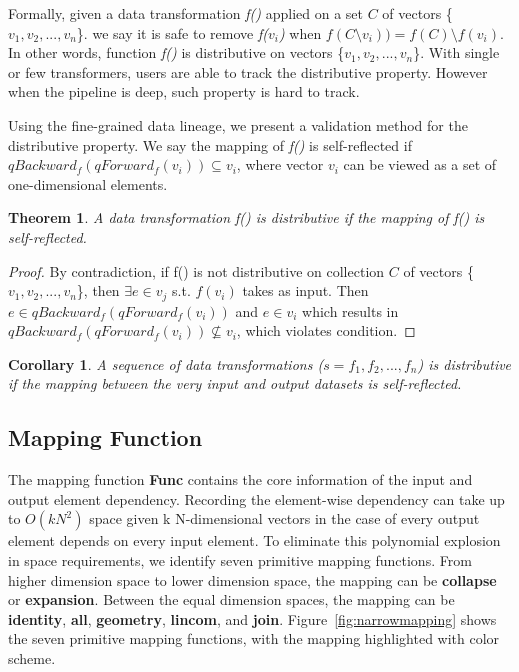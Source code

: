 \documentclass{sig-alternate}
\newtheorem{theorem}{Theorem}[section]
\newtheorem{corollary}{Corollary}[theorem]
\begin{document}
Formally, given a data transformation {\it f()} applied on a set $C$ of vectors \{$v_1, v_2, ..., v_n$\}.
we say it is safe to remove {\it f($v_i$)} when {\it $f(C \setminus {v_i})) = f(C) \setminus {f(v_i)}$}.
In other words, function {\it f()} is distributive on vectors \{$v_1, v_2, ..., v_n$\}. 
With single or few transformers, users are able to track the distributive property.
However when the pipeline is deep, such property is hard to track.

Using the fine-grained data lineage, we present a validation method for the distributive property.
We say the mapping of {\it f()} is self-reflected if $qBackward_f(qForward_f(v_i)) \subseteq v_i$, where vector $v_i$ can be viewed 
as a set of one-dimensional elements.


\begin{theorem}
\label{thm:distributive}
A data transformation f() is distributive if the mapping of f() is self-reflected.
\end{theorem}

\begin{proof}
By contradiction, if f() is not distributive on collection $C$ of vectors  \{$v_1, v_2, ..., v_n$\}, then $\exists e \in v_j $ s.t. $f(v_i)$ takes as input.
Then $e \in qBackward_f(qForward_f(v_i))$ and $e \in v_i$ which results in  $qBackward_f(qForward_f(v_i)) \nsubseteq v_i$, which violates condition.
\end{proof}

\begin{corollary}
A sequence of data transformations ($s = {f_1, f_2, ..., f_n}$) is distributive if the mapping between the very input and output datasets is self-reflected.
\end{corollary}

\subsection{Mapping Function}
\label{sec:Map-Func}
The mapping function {\bf Func} contains the core information of the input and output element dependency.
Recording the element-wise dependency can take up to $O(kN^2)$ space given k N-dimensional vectors in the case
of every output element depends on every input element. 
To eliminate this polynomial explosion in space requirements, we identify seven primitive mapping functions.
From higher dimension space to lower dimension space, the mapping can be {\bf collapse} or {\bf expansion}.
Between the equal dimension spaces, the mapping can be {\bf identity}, {\bf all}, {\bf geometry}, {\bf lincom}, and {\bf join}.
Figure~\ref{fig:narrowmapping} shows the seven primitive mapping functions, with the mapping highlighted with color scheme.
\end{document}

